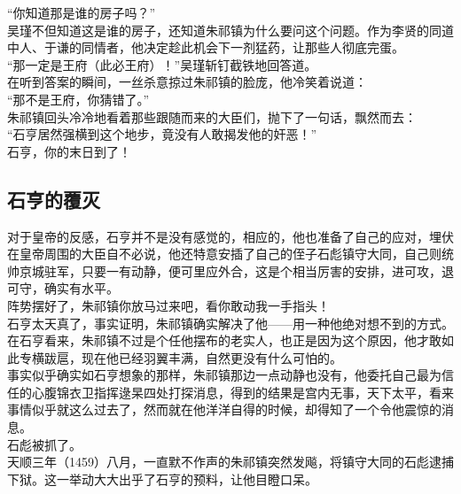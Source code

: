 \begin{multicols}{\theparacolNo}
“你知道那是谁的房子吗？”\\

吴瑾不但知道这是谁的房子，还知道朱祁镇为什么要问这个问题。作为李贤的同道中人、于谦的同情者，他决定趁此机会下一剂猛药，让那些人彻底完蛋。\\

“那一定是王府（此必王府）！”吴瑾斩钉截铁地回答道。\\

在听到答案的瞬间，一丝杀意掠过朱祁镇的脸庞，他冷笑着说道：\\

“那不是王府，你猜错了。”\\

朱祁镇回头冷冷地看着那些跟随而来的大臣们，抛下了一句话，飘然而去：\\

“石亨居然强横到这个地步，竟没有人敢揭发他的奸恶！”\\

石亨，你的末日到了！\\

\subsection{石亨的覆灭}
对于皇帝的反感，石亨并不是没有感觉的，相应的，他也准备了自己的应对，埋伏在皇帝周围的大臣自不必说，他还特意安插了自己的侄子石彪镇守大同，自己则统帅京城驻军，只要一有动静，便可里应外合，这是个相当厉害的安排，进可攻，退可守，确实有水平。\\

阵势摆好了，朱祁镇你放马过来吧，看你敢动我一手指头！\\

石亨太天真了，事实证明，朱祁镇确实解决了他——用一种他绝对想不到的方式。\\

在石亨看来，朱祁镇不过是个任他摆布的老实人，也正是因为这个原因，他才敢如此专横跋扈，现在他已经羽翼丰满，自然更没有什么可怕的。\\

事实似乎确实如石亨想象的那样，朱祁镇那边一点动静也没有，他委托自己最为信任的心腹锦衣卫指挥逯杲四处打探消息，得到的结果是宫内无事，天下太平，看来事情似乎就这么过去了，然而就在他洋洋自得的时候，却得知了一个令他震惊的消息。\\

石彪被抓了。\\

天顺三年（1459）八月，一直默不作声的朱祁镇突然发飚，将镇守大同的石彪逮捕下狱。这一举动大大出乎了石亨的预料，让他目瞪口呆。\\


\end{multicols}
